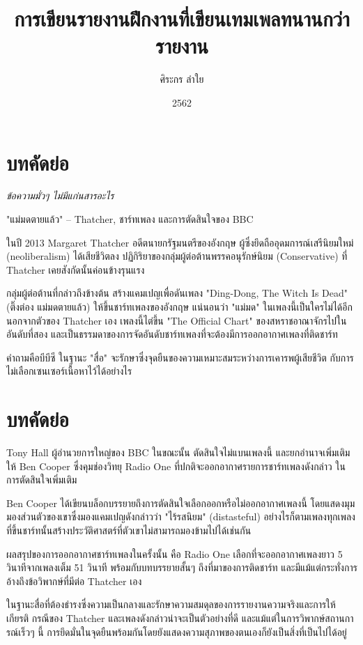 \documentclass{internshipreport}[a4]
\title{การเขียนรายงานฝึกงานที่เขียนเทมเพลทนานกว่ารายงาน}
\date{2562}
\author{ศิระกร ลำใย}
\begin{document}
\maketitle

\section*{บทคัดย่อ}

\textit{ข้อความมั่วๆ ไม่มีแก่นสารอะไร}

"แม่มดตายแล้ว" -- Thatcher, ชาร์ทเพลง และการตัดสินใจของ BBC

ในปี 2013 Margaret Thatcher อดีตนายกรัฐมนตรีของอังกฤษ ผู้ซึ่งยึดถืออุดมการณ์เสรีนิยมใหม่ (neoliberalism) ได้เสียชีวิตลง ปฏิกิริยาของกลุ่มผู้ต่อต้านพรรคอนุรักษ์นิยม (Conservative) ที่ Thatcher เคยสังกัดนั้นค่อนข้างรุนแรง

กลุ่มผู้ต่อต้านที่กล่าวถึงข้างต้น สร้างแคมเปญเพื่อดันเพลง "Ding-Dong, The Witch Is Dead" (ติ๊งต่อง แม่มดตายแล้ว) ให้ขึ้นชาร์ทเพลงของอังกฤษ แน่นอนว่า "แม่มด" ในเพลงนี้เป็นใครไม่ได้อีกนอกจากตัวของ Thatcher เอง เพลงนี้ไต่ขึ้น "The Official Chart" ของสหราชอาณาจักรไปในอันดับที่สอง และเป็นธรรมดาของการจัดอันดับชาร์ทเพลงที่จะต้องมีการออกอากาศเพลงที่ติดชาร์ท

คำถามคือบีบีซี ในฐานะ "สื่อ" จะรักษาซึ่งจุดยืนของความเหมาะสมระหว่างการเคารพผู้เสียชีวิต กับการไม่เลือกเซนเซอร์เนื้อหาไว้ได้อย่างไร

\section{บทคัดย่อ}

Tony Hall ผู้อำนวยการใหญ่ของ BBC ในขณะนั้น ตัดสินใจไม่แบนเพลงนี้ และยกอำนาจเพิ่มเติมให้ Ben Cooper ซึ่งคุมช่องวิทยุ Radio One ที่ปกติจะออกอากาศรายการชาร์ทเพลงดังกล่าว ในการตัดสินใจเพิ่มเติม

Ben Cooper ได้เขียนบล็อกบรรยายถึงการตัดสินใจเลือกออกหรือไม่ออกอากาศเพลงนี้ โดยแสดงมุมมองส่วนตัวของเขาซึ่งมองแคมเปญดังกล่าวว่า "ไร้รสนิยม" (distasteful) อย่างไรก็ตามเพลงทุกเพลงที่ขึ้นชาร์ทนั้นสร้างประวัติศาสตร์ที่ตัวเขาไม่สามารถมองข้ามไปได้เช่นกัน

ผลสรุปของการออกอากาศชาร์ทเพลงในครั้งนั้น คือ Radio One เลือกที่จะออกอากาศเพลงยาว 5 วินาทีจากเพลงเต็ม 51 วินาที พร้อมกับบทบรรยายสั้นๆ ถึงที่มาของการติดชาร์ท และมีแม้แต่กระทั่งการอ้างถึงข้อวิพากษ์ที่มีต่อ Thatcher เอง

ในฐานะสื่อที่ต้องธำรงซึ่งความเป็นกลางและรักษาความสมดุลของการรายงานความจริงและการให้เกียรติ กรณีของ Thatcher และเพลงดังกล่าวน่าจะเป็นตัวอย่างที่ดี และแม้แต่ในการวิพากษ์สถานการณ์เร็วๆ นี้ การยึดมั่นในจุดยืนพร้อมกันโดยยังแสดงความสุภาพของตนเองก็ยังเป็นสิ่งที่เป็นไปได้อยู่
\end{document}

